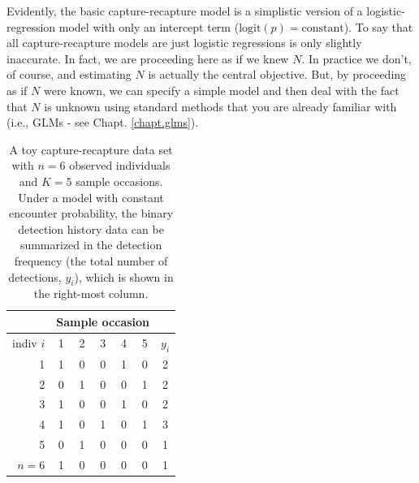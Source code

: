 Evidently, the basic capture-recapture model is a
simplistic version of a logistic-regression model with only an
intercept term ($\mbox{logit}(p) = \mbox{constant}$).  To say that all
capture-recapture models are just logistic regressions is only
slightly inaccurate. In fact, we are proceeding here as if we knew $N$.
In practice we don't, of course, and
estimating
$N$ is actually the central objective.
But, by proceeding as if $N$ were known,
we can specify a simple model and then deal with the
fact that $N$ is unknown using standard methods that you are already
familiar with (i.e., GLMs - see Chapt. \ref{chapt.glms}).
\begin{table}
\centering
\caption{A toy capture-recapture data set with $n=6$ observed
  individuals and $K=5$ sample occasions. Under a model with constant encounter
  probability, the binary detection history data can be summarized in the detection frequency (the total number of detections, $y_i$), which is shown in the right-most column.
}
\begin{tabular}{r|ccccc|c}
\hline
&  \multicolumn{5}{c}{Sample occasion} &  \\ \hline
 indiv $i$ &  1 & 2 & 3 & 4 & 5 & $y_{i}$ \\ \hline
  1 &     1 & 0 & 0 & 1 & 0  & 2   \\
  2 &     0 & 1 & 0 & 0 & 1  & 2   \\
  3 &     1 & 0 & 0 & 1 & 0  & 2   \\
  4 &     1 & 0 & 1 & 0 & 1  & 3   \\
  5 &     0 & 1 & 0 & 0 & 0  & 1   \\
  $n=6$ & 1 & 0 & 0 & 0 & 0  & 1   \\ \hline
\end{tabular}
\label{closed.tab.3.1}
\end{table}


